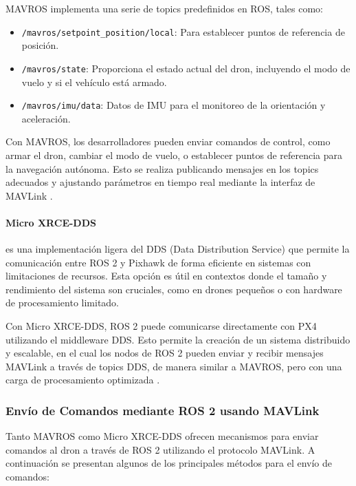             MAVROS implementa una serie de topics predefinidos en ROS, tales como:
            \begin{itemize}
                \item \texttt{/mavros/setpoint\_position/local}: Para establecer puntos de referencia de posición.
                \item \texttt{/mavros/state}: Proporciona el estado actual del dron, incluyendo el modo de vuelo y si el vehículo está armado.
                \item \texttt{/mavros/imu/data}: Datos de IMU para el monitoreo de la orientación y aceleración.
            \end{itemize}
            
            Con MAVROS, los desarrolladores pueden enviar comandos de control, como armar el dron, cambiar el modo de vuelo, o establecer puntos de referencia para la navegación autónoma. Esto se realiza publicando mensajes en los topics adecuados y ajustando parámetros en tiempo real mediante la interfaz de MAVLink \cite{px4_ros2}.
    
            \paragraph{Micro XRCE-DDS}
            es una implementación ligera del DDS (Data Distribution Service) que permite la comunicación entre ROS 2 y Pixhawk de forma eficiente en sistemas con limitaciones de recursos. Esta opción es útil en contextos donde el tamaño y rendimiento del sistema son cruciales, como en drones pequeños o con hardware de procesamiento limitado.
    
            Con Micro XRCE-DDS, ROS 2 puede comunicarse directamente con PX4 utilizando el middleware DDS. Esto permite la creación de un sistema distribuido y escalable, en el cual los nodos de ROS 2 pueden enviar y recibir mensajes MAVLink a través de topics DDS, de manera similar a MAVROS, pero con una carga de procesamiento optimizada \cite{px4_ros2}.
    
        \subsubsection{Envío de Comandos mediante ROS 2 usando MAVLink}
        Tanto MAVROS como Micro XRCE-DDS ofrecen mecanismos para enviar comandos al dron a través de ROS 2 utilizando el protocolo MAVLink. A continuación se presentan algunos de los principales métodos para el envío de comandos:
    

